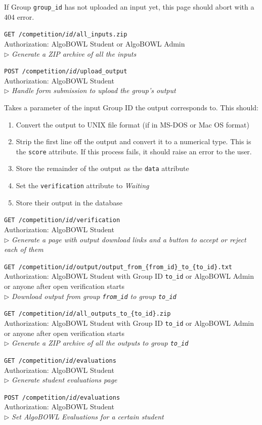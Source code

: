 \documentclass[12pt]{article}
\newcommand\ctrltitle[1]{\par\medskip\texttt{\large #1}\\}
\newcommand\ctrlauth[1]{Authorization: #1\\}
\newcommand\ctrldesc[1]{$\rhd$ \textsl{#1}\par\medskip}
\begin{document}
If Group \texttt{group\_id} has not uploaded an input yet, this page should
abort with a 404 error.

\ctrltitle{GET /competition/\emph{id}/all\_inputs.zip}
\ctrlauth{AlgoBOWL Student or AlgoBOWL Admin}
\ctrldesc{Generate a ZIP archive of all the inputs}

\ctrltitle{POST /competition/\emph{id}/upload\_output}
\ctrlauth{AlgoBOWL Student}
\ctrldesc{Handle form submission to upload the group's output}

Takes a parameter of the input Group ID the output corresponds to. This should:

\begin{enumerate}
    \item Convert the output to UNIX file format (if in MS-DOS or Mac OS format)
    \item Strip the first line off the output and convert it to a numerical
        type. This is the \texttt{score} attribute. If this process fails, it
        should raise an error to the user.
    \item Store the remainder of the output as the \texttt{data} attribute
    \item Set the \texttt{verification} attribute to \emph{Waiting}
    \item Store their output in the database
\end{enumerate}

\ctrltitle{GET /competition/\emph{id}/verification}
\ctrlauth{AlgoBOWL Student}
\ctrldesc{Generate a page with output download links and a button to accept or
reject each of them}

\ctrltitle{GET /competition/\emph{id}/output/output\_from\_\{from\_id\}\_to\_\{to\_id\}.txt}
\ctrlauth{AlgoBOWL Student with Group ID \texttt{to\_id} or AlgoBOWL Admin or
anyone after open verification starts}
\ctrldesc{Download output from group \texttt{from\_id} to group
\texttt{to\_id}}

\ctrltitle{GET /competition/\emph{id}/all\_outputs\_to\_\{to\_id\}.zip}
\ctrlauth{AlgoBOWL Student with Group ID \texttt{to\_id} or AlgoBOWL Admin or
anyone after open verification starts}
\ctrldesc{Generate a ZIP archive of all the outputs to group \texttt{to\_id}}

\ctrltitle{GET /competition/\emph{id}/evaluations}
\ctrlauth{AlgoBOWL Student}
\ctrldesc{Generate student evaluations page}

\ctrltitle{POST /competition/\emph{id}/evaluations}
\ctrlauth{AlgoBOWL Student}
\ctrldesc{Set AlgoBOWL Evaluations for a certain student}
\end{document}
